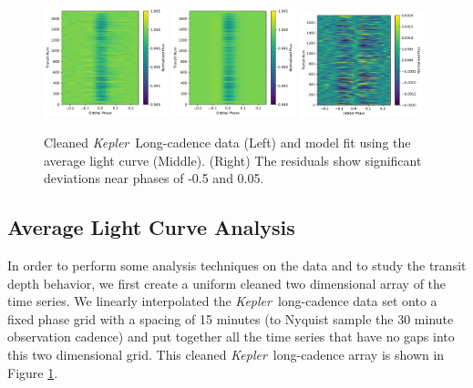 \documentclass[preprint]{aastex61}
\newcommand{\kepler}{{\it Kepler}}
\begin{document}
\begin{figure}[!hbtp]
\begin{centering}
\includegraphics[width=0.32\textwidth]{images/kepler/photometry_riverplot.pdf}
\includegraphics[width=0.32\textwidth]{images/kepler/model_riverplot.pdf}
\includegraphics[width=0.32\textwidth]{images/kepler/residual_riverplot.pdf}
\caption{Cleaned \kepler\ Long-cadence data (Left) and model fit using the average light curve (Middle).
(Right) The residuals show significant deviations near phases of -0.5 and 0.05.
}\label{fig:riverPlots}
\end{centering}
\end{figure}

\subsection{Average Light Curve Analysis}

In order to perform some analysis techniques on the data and to study the transit depth behavior, we first create a uniform cleaned two dimensional array of the time series.
We linearly interpolated the \kepler\ long-cadence data set onto a fixed phase grid with a spacing of 15 minutes (to Nyquist sample the 30 minute observation cadence) and put together all the time series that have no gaps into this two dimensional grid.
This cleaned \kepler\ long-cadence array is shown in Figure \ref{fig:riverPlots}.
\end{document}
